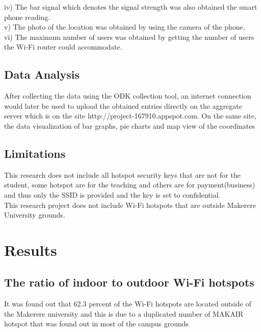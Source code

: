 \documentclass[14pt, a4paper]{article}
\begin{document}
iv)	The bar signal which denotes the signal strength was also obtained the smart phone reading.\\

v)	The photo of the location was obtained by using the camera of the phone.\\

vi)	The maximum number of users was obtained by getting the number of users the Wi-Fi router could accommodate.\\


			\subsection{Data Analysis}

After collecting the data using the ODK collection tool, an internet connection would later be used to upload the obtained entries directly on the aggregate server which is on the site http://project-167910.appspot.com. On the same site, the data visualization of bar graphs, pie charts and map view of the coordinates \\

			\subsection{Limitations}

This research does not include all hotspot security keys that are not for the student, some hotspot are for the teaching and others are for payment(business) and thus only the SSID is provided and the key is set to confidential.\\
This research project does not include Wi-Fi hotspots that are outside Makerere University grounds.\\


			\section{Results}

			\subsection{The ratio of indoor to outdoor Wi-Fi hotspots}
It was found out that 62.3 percent of the Wi-Fi hotspots are located outside of the Makerere university and this is due to a duplicated number of MAKAIR hotspot that was found out in most of the campus grounds\\
\end{document}
